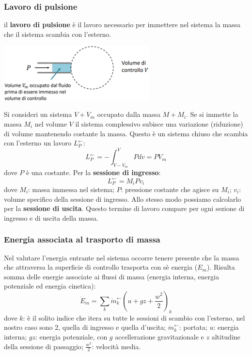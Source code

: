 \subsubsection{Lavoro di pulsione}
il \textbf{lavoro di pulsione} è il lavoro necessario per immettere nel sistema la massa che il sistema scambia con l'esterno.
\begin{center}
    \includegraphics[height=3cm]{../L06/img2.PNG}
\end{center}
Si consideri un sistema $V + V_m$ occupato dalla massa $M + M_i$. Se si immette la massa $M_i$ nel volume $V$ il sistema complessivo subisce una variazione (riduzione) di volume mantenendo costante la massa.\newline
\newline
Questo è un sistema chiuso che scambia con l'esterno un lavoro $L_P^\leftarrow $:
\[
    L_P^\leftarrow  = - \int_{V-V_m}^{V}Pdv = P V_m
\]
dove $P$ è una costante. \newline
\newline
Per la \textbf{sessione di ingresso}:
\[
    L_P^\leftarrow  = M_i P v_i
\]
dove \newline
$M_i$: massa immessa nel sistema;\newline
$P$: pressione costante che agisce su $M_i$; \newline
$v_i$: volume specifico della sessione di ingresso.\newline
Allo stesso modo possiamo calcolarlo per la \textbf{sessione di uscita}.\newline
\newline
Questo termine di lavoro compare per ogni sezione di ingresso e di uscita della massa.
\subsubsection{Energia associata al trasporto di massa}
Nel valutare l'energia entrante nel sistema occorre tenere presente che la massa che attraversa la superficie di controllo trasporta con sè energia ($E_m$).\newline
\newline
Risulta somma delle energie associate ai flussi di massa (energia interna, energia potenziale ed energia cinetica):
\[
    \dot{E}_m = \sum_{k} \dot{m}_k^\leftarrow \left(u + gz + \frac{w^2}{2}\right)_k
\]
dove \newline
$k$: è il solito indice che itera su tutte le sessioni di scambio con l'esterno, nel nostro caso sono 2, quella di ingresso e quella d'uscita;\newline
$\dot{m}_k^\leftarrow $: portata; \newline
$u$: energia interna;\newline
$gz$: energia potenziale, con $g$ accellerazione gravitazionale e $z$ altitudine della sessione di passaggio;\newline
$\frac{w^2}{2}$: velocità media.

